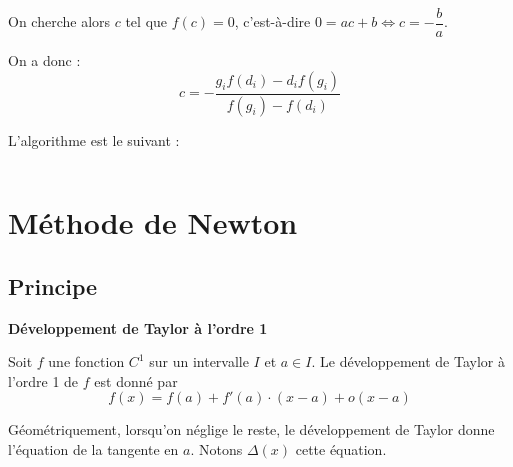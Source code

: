 \documentclass[10pt,fleqn]{article} %
\begin{document}
On cherche alors  $c$ tel que $f(c)=0$, c'est-à-dire $0=ac+b \Longleftrightarrow c = -\dfrac{b}{a}$.

On a donc : 
$$
c = -\dfrac{g_i f(d_i) -d_if(g_i) }{f(g_i)  - f(d_i) }
$$



\begin{pseudo}
L'algorithme est le suivant :

\begin{algorithm}[H]
\end{algorithm}
\end{pseudo}

\else
$$ \quad $$
\vspace{12cm}
\newpage

\fi

\section{Méthode de Newton}

\subsection{Principe}
\begin{theorem}
\textbf{Développement de Taylor à l'ordre 1}

Soit $f$ une fonction $C^1$ sur un intervalle $I$ et $a\in I$. Le développement de Taylor à l'ordre 1 de $f$ est donné par 
$$
f(x)=f(a)+ f'(a)\cdot(x-a)+\mathit{o}(x-a)
$$
\end{theorem}

Géométriquement, lorsqu'on néglige le reste, le développement de Taylor donne l'équation de la tangente en $a$. Notons $\Delta(x)$ cette équation.
\end{document}
